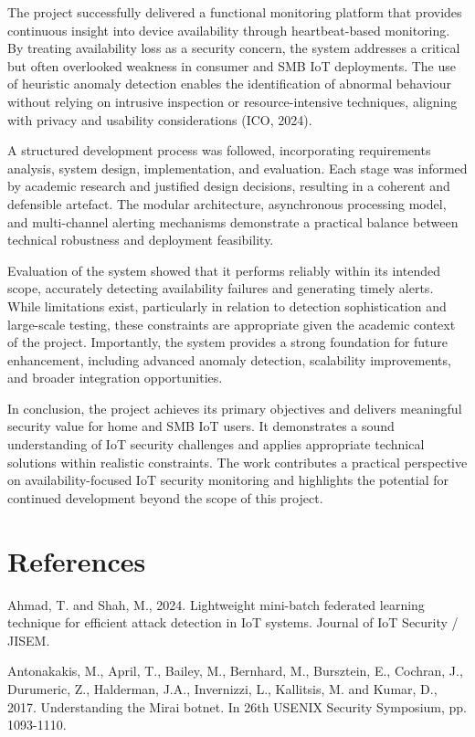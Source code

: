 The project successfully delivered a functional monitoring platform that provides continuous insight into device availability through heartbeat-based monitoring. By treating availability loss as a security concern, the system addresses a critical but often overlooked weakness in consumer and SMB IoT deployments. The use of heuristic anomaly detection enables the identification of abnormal behaviour without relying on intrusive inspection or resource-intensive techniques, aligning with privacy and usability considerations (ICO, 2024).

A structured development process was followed, incorporating requirements analysis, system design, implementation, and evaluation. Each stage was informed by academic research and justified design decisions, resulting in a coherent and defensible artefact. The modular architecture, asynchronous processing model, and multi-channel alerting mechanisms demonstrate a practical balance between technical robustness and deployment feasibility.

Evaluation of the system showed that it performs reliably within its intended scope, accurately detecting availability failures and generating timely alerts. While limitations exist, particularly in relation to detection sophistication and large-scale testing, these constraints are appropriate given the academic context of the project. Importantly, the system provides a strong foundation for future enhancement, including advanced anomaly detection, scalability improvements, and broader integration opportunities.

In conclusion, the project achieves its primary objectives and delivers meaningful security value for home and SMB IoT users. It demonstrates a sound understanding of IoT security challenges and applies appropriate technical solutions within realistic constraints. The work contributes a practical perspective on availability-focused IoT security monitoring and highlights the potential for continued development beyond the scope of this project.

\chapter{References}

Ahmad, T. and Shah, M., 2024. Lightweight mini-batch federated learning technique for efficient attack detection in IoT systems. Journal of IoT Security / JISEM.

Antonakakis, M., April, T., Bailey, M., Bernhard, M., Bursztein, E., Cochran, J., Durumeric, Z., Halderman, J.A., Invernizzi, L., Kallitsis, M. and Kumar, D., 2017. Understanding the Mirai botnet. In 26th USENIX Security Symposium, pp. 1093-1110.


